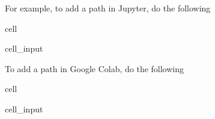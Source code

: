 \documentclass[letterpaper,10pt,english]{jupyterBook}
\begin{document}
\sphinxAtStartPar
For example, to add a path in Jupyter, do the following

\begin{sphinxuseclass}{cell}\begin{sphinxVerbatimInput}

\begin{sphinxuseclass}{cell_input}
\begin{sphinxVerbatim}[commandchars=\\\{\}]
  
\end{sphinxVerbatim}

\end{sphinxuseclass}\end{sphinxVerbatimInput}

\end{sphinxuseclass}
\sphinxAtStartPar
To add a path in Google Colab, do the following

\begin{sphinxuseclass}{cell}\begin{sphinxVerbatimInput}

\begin{sphinxuseclass}{cell_input}
\begin{sphinxVerbatim}[commandchars=\\\{\}]
   

  
\end{sphinxVerbatim}

\end{sphinxuseclass}\end{sphinxVerbatimInput}

\end{sphinxuseclass}
\end{document}
